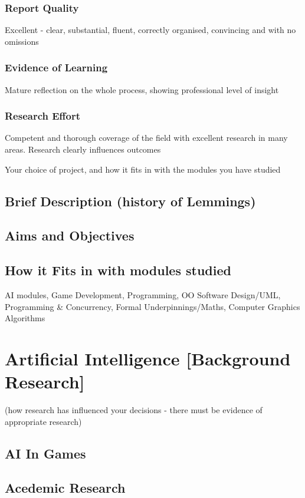 \documentclass[runningheads,a4paper]{llncs}
\begin{document}
	\subsubsection{Report Quality}  
	Excellent - clear, substantial, fluent, correctly organised, convincing and with no omissions
	
	\subsubsection{Evidence of Learning}
	Mature reflection on the whole process, showing professional level of insight
	
	\subsubsection{Research Effort}
	Competent and thorough coverage of the field with excellent research in many areas. Research clearly influences outcomes   

Your choice of project, and how it fits in with the modules you have studied
	\subsection{Brief Description (history of Lemmings)}
	\subsection{Aims and Objectives}
	\subsection{How it Fits in with modules studied}
	AI modules, Game Development, Programming, OO Software Design/UML, Programming \& Concurrency, Formal Underpinnings/Maths, Computer Graphics Algorithms

\section{Artificial Intelligence [Background Research]}
(how research has influenced your decisions - there must be evidence of appropriate research)

	\subsection{AI In Games}
	\subsection{Acedemic Research}
\end{document}
